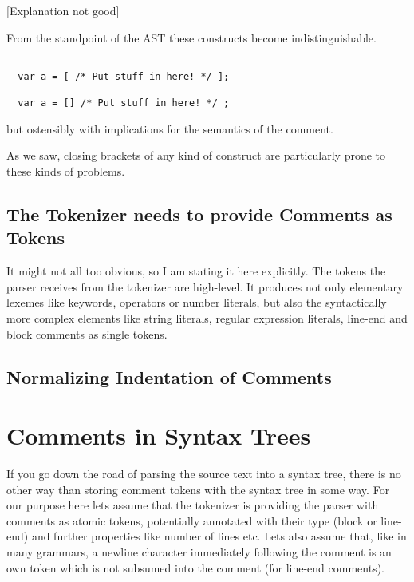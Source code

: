 \documentclass[11pt,a4paper]{article}
\begin{document}
[Explanation not good]

From the standpoint of the AST these constructs become indistinguishable.

\begin{verbatim}

  var a = [ /* Put stuff in here! */ ];

  var a = [] /* Put stuff in here! */ ;

\end{verbatim}

but ostensibly with implications for the semantics of the comment.

As we saw, closing brackets of any kind of construct are
particularly prone to these kinds of problems.


\subsection{The Tokenizer needs to provide Comments as Tokens}

It might not all too obvious, so I am stating it here explicitly. The tokens the
parser receives from the tokenizer are high-level. It produces not only
elementary lexemes like keywords, operators or number literals, but also the
syntactically more complex elements like string literals, regular expression
literals, line-end and block comments as single tokens.


\subsection{Normalizing Indentation of Comments}


\section{Comments in Syntax Trees}

If you go down the road of parsing the source text into a syntax tree, there is
no other way than storing comment tokens with the syntax tree in some way. For
our purpose here lets assume that the tokenizer is providing the parser with
comments as atomic tokens, potentially annotated with their type (block or
line-end) and further properties like number of lines etc. Lets also assume
that, like in many grammars, a newline character immediately following the
comment is an own token which is not subsumed into the comment (for line-end
comments).
\end{document}
